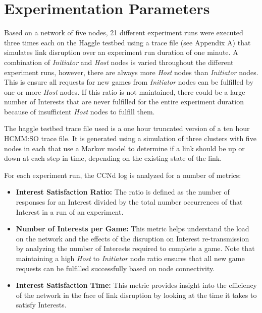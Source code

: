 \documentclass[a4paper,12pt]{report}      %
\begin{document}
\section{Experimentation Parameters} 

Based on a network of five nodes, 21 different experiment runs were executed three times each on the Haggle testbed
using a trace file (see Appendix A) that simulates link disruption over an experiment run duration of one minute. A
combination of \emph{Initiator} and \emph{Host} nodes is varied throughout the different experiment runs, however, there are always
more \emph{Host} nodes than \emph{Initiator} nodes. This is ensure all requests for new games from \emph{Initiator} nodes can be fulfilled
by one or more \emph{Host} nodes. If this ratio is not maintained, there could be a large number of Interests that are never
fulfilled for the entire experiment duration because of insufficient \emph{Host} nodes to fulfill them. 

The haggle testbed trace file used is a one hour truncated version of a ten hour HCMM:SO trace file. It is generated using a simulation of three clusters with five nodes in each that use a Markov model to determine if a link should be up or down at each step in time, depending on the existing state of the link\cite{haggletrc}.

\noindent For each experiment run, the CCNd log is analyzed for a number of metrics:

\begin{itemize}
\item \textbf{Interest Satisfaction Ratio:} The ratio is defined as the number of responses for an Interest divided
 by the total number occurrences of that Interest in a run of an experiment.

\item \textbf{Number of Interests per Game:} This metric helps understand the load on the network and the
effects of the disruption on Interest re-transmission by analyzing the number of Interests
required to complete a game. Note that maintaining a high \emph{Host} to \emph{Initiator} node ratio ensures
that all new game requests can be fulfilled successfully based on node connectivity.

\item \textbf{Interest Satisfaction Time:} This metric provides insight into the efficiency of the network in the
face of link disruption by looking at the time it takes to satisfy Interests.
\end{itemize}
\end{document}
